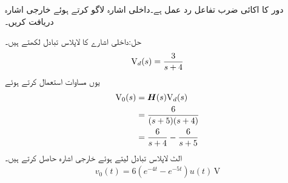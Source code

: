 
دور کا اکائی ضرب تفاعل رد عمل  ہے۔داخلی اشارہ  لاگو کرتے ہوئے خارجی اشارہ  دریافت کریں۔

حل:داخلی اشارے کا لاپلاس تبادل لکھتے ہیں۔
\begin{align*}
{\ensuremath{{\textup{V}}}}_d(s)=\frac{3}{s+4}
\end{align*}
یوں مساوات استعمال کرتے ہوئے
\begin{align*}
{\ensuremath{{\textup{V}}}}_0(s)&={{\boldsymbol{H}}}(s) {{\textup{V}}}_d(s)\\
&=\frac{6}{(s+5)(s+4)}\\
&=\frac{6}{s+4}-\frac{6}{s+5}
\end{align*}
الٹ لاپلاس تبادل لیتے ہوئے خارجی اشارہ حاصل کرتے ہیں۔
\begin{align*}
v_0(t)=6\left(e^{-4t}-e^{-5t}\right)u(t)\,\si{\volt}
\end{align*}

